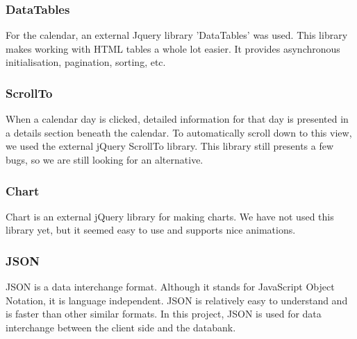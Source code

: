 \subsubsection{DataTables} 
For the calendar, an external Jquery library 'DataTables' was used. This library makes
working with HTML tables a whole lot easier. It provides asynchronous initialisation,
pagination, sorting, etc.

\subsubsection{ScrollTo}
When a calendar day is clicked, detailed information for that day is presented in a
details section beneath the calendar. To automatically scroll down to this view, we
used the external jQuery ScrollTo library. This library still presents a few bugs, so we
are still looking for an alternative.

\subsubsection{Chart}
Chart is an external jQuery library for making charts. We have not used this library yet,
but it seemed easy to use and supports nice animations.

\subsubsection{JSON}
JSON is a data interchange format. Although it stands for JavaScript Object Notation, it
is language independent. JSON is relatively easy to understand and is faster than other
similar formats. In this project, JSON is used for data interchange between the client
side and the databank. 
